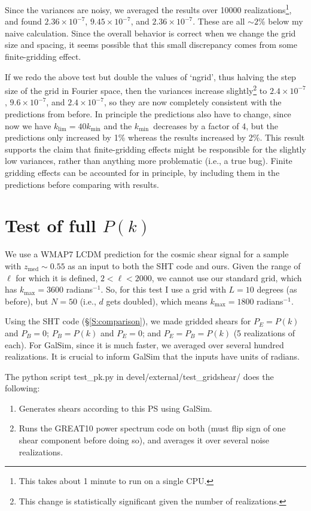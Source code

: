 \documentclass[preprint]{aastex}
\newcommand{\klim}{\ensuremath{k_\mathrm{lim}}}
\newcommand{\kmax}{\ensuremath{k_\mathrm{max}}}
\newcommand{\kmin}{\ensuremath{k_\mathrm{min}}}
\begin{document}
Since the variances are noisy, we averaged the results over 10000
realizations\footnote{This takes about 1 minute to run on a single
  CPU.}, and found $2.36\times 10^{-7}$, $9.45\times 10^{-7}$, and
$2.36\times 10^{-7}$.  These are all $\sim 2$\% below my naive calculation.
Since the overall behavior is correct when we change the grid size and
spacing, it seems possible that this small discrepancy comes from some
finite-gridding effect.

If we redo the above test but double the values of `ngrid', thus
halving the step size of the grid in Fourier space, then the variances
increase slightly\footnote{This change is statistically significant given
the number of realizations.} to $2.4\times 10^{-7}$, $9.6\times 10^{-7}$, and
$2.4\times 10^{-7}$, so they are now completely consistent with the
predictions from before.  In principle the predictions also have to
change, since now we have $\klim=40\kmin$ and the \kmin\ decreases by
a factor of 4, but the predictions only increased by 1\% whereas the
results increased by 2\%.  This result supports the claim that finite-gridding
effects might be responsible for the slightly low variances, rather
than anything more problematic (i.e., a true bug).  Finite gridding
effects can be accounted for in principle, by including them in the
predictions before comparing with results.

\section{Test of full $P(k)$}\label{S:testpk}

We use a WMAP7 LCDM prediction for the cosmic shear signal for a
sample with $z_\mathrm{med}\sim 0.55$ as an input to both
the SHT code and ours.  Given the range of $\ell$ for which it is
defined, $2<\ell<2000$, we cannot use our standard grid, which 
has $\kmax=3600$ radians$^{-1}$.  So, for this test I use a grid with
$L=10$ degrees (as before), but $N=50$ (i.e., $d$ gets doubled), which
means $\kmax=1800$ radians$^{-1}$.

Using the SHT code (\S\ref{S:comparison}), we made gridded shears for
$P_E=P(k)$ and $P_B=0$; $P_B=P(k)$ and $P_E=0$; and $P_E=P_B=P(k)$ (5
realizations of each).  For GalSim, since it is much faster, we
averaged over several hundred realizations.  It is crucial to inform
GalSim that the inputs have units of radians.

The python script test\_pk.py in devel/external/test\_gridshear/ does the following:
\begin{enumerate}
\item Generates shears according to this PS using GalSim.
\item Runs the GREAT10 power spectrum code on both (must flip sign of
  one shear component before doing so), and averages it over several
  noise realizations.
\end{enumerate}
\end{document}
